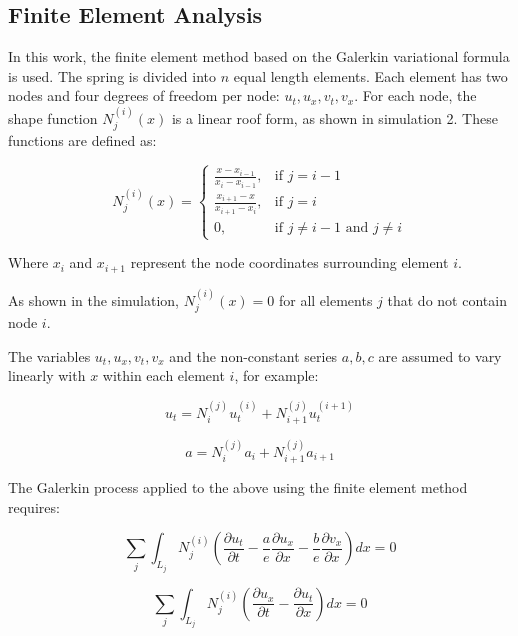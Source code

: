 \documentclass{mcmthesis}  %
\begin{document}
\begin{appendices}
\section{Finite Element Analysis}  %

In this work, the finite element method based on the Galerkin variational formula is used. The spring is divided into $n$ equal length elements. Each element has two nodes and four degrees of freedom per node: $u_t, u_x, v_t, v_x$. For each node, the shape function $N_j^{(i)}(x)$ is a linear roof form, as shown in simulation 2. These functions are defined as:

\begin{equation}
N_j^{(i)}(x) = 
\begin{cases}
\frac{x-x_{i-1}}{x_i-x_{i-1}}, & \text{if } j = i-1 \\
\frac{x_{i+1}-x}{x_{i+1}-x_i}, & \text{if } j = i \\
0, & \text{if } j \neq i-1 \text{ and } j \neq i
\end{cases}
\end{equation}

Where $x_i$ and $x_{i+1}$ represent the node coordinates surrounding element $i$.

As shown in the simulation, $N_j^{(i)}(x) = 0$ for all elements $j$ that do not contain node $i$.

The variables $u_t, u_x, v_t, v_x$ and the non-constant series $a, b, c$ are assumed to vary linearly with $x$ within each element $i$, for example:

\begin{equation}
u_t = N_i^{(j)}u_t^{(i)} + N_{i+1}^{(j)}u_t^{(i+1)}
\end{equation}

\begin{equation}
a = N_i^{(j)}a_i + N_{i+1}^{(j)}a_{i+1}
\end{equation}

The Galerkin process applied to the above using the finite element method requires:

\begin{equation}
\sum_j \int_{L_j} N_j^{(i)} \left(\frac{\partial u_t}{\partial t} - \frac{a}{e}\frac{\partial u_x}{\partial x} - \frac{b}{e}\frac{\partial v_x}{\partial x}\right) dx = 0
\end{equation}

\begin{equation}
\sum_j \int_{L_j} N_j^{(i)} \left(\frac{\partial u_x}{\partial t} - \frac{\partial u_t}{\partial x}\right) dx = 0
\end{equation}


\end{appendices}
\end{document}
